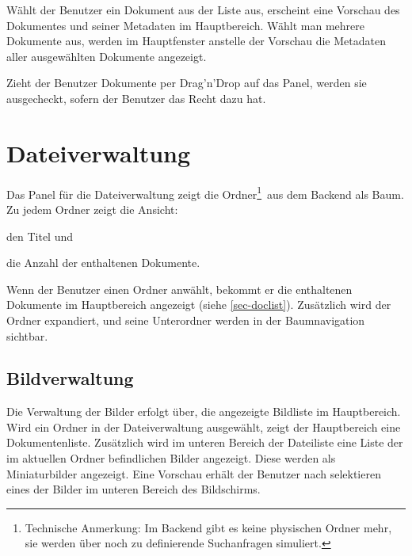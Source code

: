   Wählt der Benutzer ein Dokument aus der Liste aus, erscheint eine Vorschau
  des Dokumentes und seiner Metadaten im Hauptbereich. Wählt man mehrere
  Dokumente aus, werden im Hauptfenster anstelle der Vorschau die Metadaten
  aller ausgewählten Dokumente angezeigt.

  Zieht der Benutzer Dokumente per Drag'n'Drop auf das Panel, werden sie
  ausgecheckt, sofern der Benutzer das Recht dazu hat.


  
\section{Dateiverwaltung}

 
  Das Panel für die Dateiverwaltung zeigt die Ordner\footnote{Technische
  Anmerkung: Im Backend gibt es keine physischen Ordner mehr, sie werden über
  noch zu definierende Suchanfragen simuliert.}\ aus
  dem Backend als Baum. Zu jedem Ordner zeigt die Ansicht:
  \begin{compactitem}
    \item den Titel und
    \item die Anzahl der enthaltenen Dokumente.
  \end{compactitem}

  Wenn der Benutzer einen Ordner anwählt, bekommt er die enthaltenen Dokumente
  im Hauptbereich angezeigt (siehe \vref{sec-doclist}). Zusätzlich wird der
  Ordner expandiert, und seine Unterordner werden in der Baumnavigation
  sichtbar.

\subsection{Bildverwaltung}


Die Verwaltung der Bilder erfolgt über, die angezeigte Bildliste im 
Hauptbereich. Wird ein Ordner in der Dateiverwaltung ausgewählt, 
zeigt der Hauptbereich eine Dokumentenliste. Zusätzlich wird im unteren 
Bereich der Dateiliste eine Liste der im aktuellen Ordner befindlichen 
Bilder angezeigt. Diese werden als Miniaturbilder angezeigt.
Eine Vorschau erhält der Benutzer nach selektieren 
eines der Bilder im unteren Bereich des Bildschirms.


